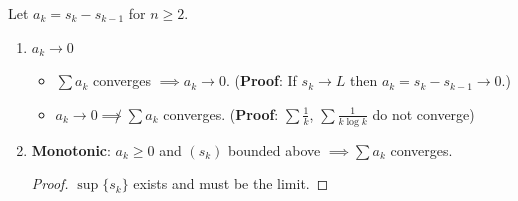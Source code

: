 \begin{theorem*}\hspace{0pt}
  Let $a_k = s_k - s_{k-1}$ for $n \geq 2$.
  \begin{enumerate}[label=(\roman*)]
  \item $a_k \to 0$
    \begin{itemize}
    \item $\sum a_k$ converges $\implies a_k \to 0$. ({\bf Proof}: If $s_k \to L$ then $a_k = s_k - s_{k-1} \to 0$.)
    \item $a_k \to 0 \not \implies \sum a_k$ converges. ({\bf Proof}: $\sum \frac{1}{k}$, $\sum \frac{1}{k\log k}$
      do not converge)
    \end{itemize}
  \item {\bf Monotonic}: $a_k \geq 0$ and $(s_k)$ bounded above $\implies \sum a_k$ converges.
    \begin{proof}
      $\sup \{s_k\}$ exists and must be the limit.
    \end{proof}





\end{enumerate}
\end{theorem*}

